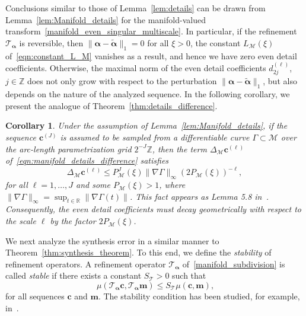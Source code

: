 \documentclass[12pt]{article}
\newtheorem{coro}[theorem]{Corollary}
\begin{document}
Conclusions similar to those of Lemma~\ref{lem:details} can be drawn from Lemma~\ref{lem:Manifold_details} for the manifold-valued transform~\eqref{manifold_even_singular_multiscale}. In particular, if the refinement $\mathcal{T}_{\boldsymbol{\alpha}}$ is reversible, then $\|\boldsymbol{\alpha}-\widetilde{\boldsymbol{\alpha}}\|_1=0$ for all $\xi>0$, the constant $L_\mathcal{M}(\xi)$ of~\eqref{eqn:constant_L_M} vanishes as a result, and hence we have zero even detail coefficients. Otherwise, the maximal norm of the even detail coefficients $d^{(\ell)}_{2j}$, $j\in\mathbb{Z}$ does not only grow with respect to the perturbation $\|\boldsymbol{\alpha}-\widetilde{\boldsymbol{\alpha}}\|_1$, but also depends on the nature of the analyzed sequence. In the following corollary, we present the analogue of Theorem~\ref{thm:details_difference}.

\begin{coro}
    Under the assumption of Lemma~\ref{lem:Manifold_details}, if the sequence $\boldsymbol{c}^{(J)}$ is assumed to be sampled from a differentiable curve $\Gamma\subset\mathcal{M}$ over the arc-length parametrization grid $2^{-J}\mathbb{Z}$, then the term $\Delta_\mathcal{M}\boldsymbol{c}^{(\ell)}$ of~\eqref{eqn:manifold_details_difference} satisfies
    \begin{equation*}
        \Delta_{\mathcal{M}}\boldsymbol{c}^{(\ell)}\leq P_{\mathcal{M}}^J(\xi)\|\nabla\Gamma\|_\infty(2P_{\mathcal{M}}(\xi))^{-\ell},
    \end{equation*}
    for all $\ell=1,\dots,J$ and some $P_{\mathcal{M}}(\xi)>1$, where $\|\nabla\Gamma\|_\infty=\sup_{t\in\mathbb{R}}\|\nabla\Gamma(t)\|$. This fact appears as Lemma 5.8 in~\cite{mattar2023pyramid}. Consequently, the even detail coefficients must decay geometrically with respect to the scale $\ell$ by the factor $2P_{\mathcal{M}}(\xi)$.
\end{coro}

We next analyze the synthesis error in a similar manner to Theorem~\ref{thm:synthesis_theorem}. To this end, we define the \emph{stability} of refinement operators. A refinement operator $\mathcal{T}_{\boldsymbol{\alpha}}$ of~\eqref{manifold_subdivision} is called \emph{stable} if there exists a constant $S_{\mathcal{T}}>0$ such that
\begin{equation}~\label{eqn:stability}
    \mu (\mathcal{T}_{\boldsymbol{\alpha}}\boldsymbol{c}, \mathcal{T}_{\boldsymbol{\alpha}}\boldsymbol{m}) \leq S_{\mathcal{T}} \mu(\boldsymbol{c},\boldsymbol{m}),
\end{equation}
for all sequences $\boldsymbol{c}$ and $\boldsymbol{m}$. The stability condition has been studied, for example, in~\cite{grohs2010stability}.
\end{document}

